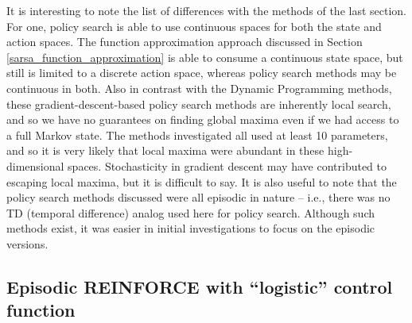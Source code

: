 \documentclass{article}
\begin{document}
It is interesting to note the list of differences with the methods of the last section.  For one, policy search is able to use continuous spaces for both the state and action spaces.  The function approximation approach discussed in Section \ref{sarsa_function_approximation} is able to consume a continuous state space, but still is limited to a discrete action space, whereas policy search methods may be continuous in both.  Also in contrast with the Dynamic Programming methods, these gradient-descent-based policy search methods are inherently local search, and so we have no guarantees on finding global maxima even if we had access to a full Markov state.  The methods investigated all used at least 10 parameters, and so it is very likely that local maxima were abundant in these high-dimensional spaces.  Stochasticity in gradient descent may have contributed to escaping local maxima, but it is difficult to say.  It is also useful to note that the policy search methods discussed were all episodic in nature -- i.e., there was no TD (temporal difference) analog used here for policy search.  Although such methods exist, it was easier in initial investigations to focus on the episodic versions.

\subsection{Episodic REINFORCE with ``logistic'' control function}
\end{document}
